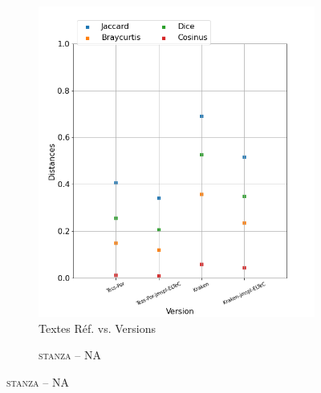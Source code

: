 \begin{figure}[H]
\begin{minipage}{6cm}
  \begin{subfigure}{0.89\textwidth}
  \includegraphics[width=.89\textwidth]{IMAGES/ELTeC_DISTANCES_spaCy3.5.1/CASTRO-OSORIO-graph-dist-spaCy3.5.1-txt.png} 
  \caption{Textes Réf. vs. Versions}
  \label{fig:CASTRO-OSORIO-graph-dist-txt}
  \end{subfigure}
  \end{minipage}
  \begin{minipage}{6cm}
  \begin{subfigure}{0.89\textwidth}
   \caption{\textsc{stanza} -- NA}
 

\end{subfigure}
\end{minipage}
\end{figure}
